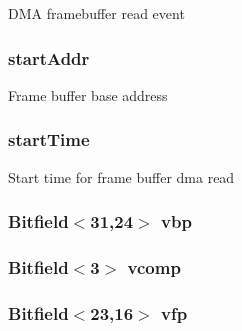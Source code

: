 \label{classPl111_a48f76313a745a16ffbdc95fbc4dfebf2}
DMA framebuffer read event \hypertarget{classPl111_aee7739bdc9884d0ee837a99b832cf0d1}{
\subsubsection[{startAddr}]{ {\bf startAddr}}}
\label{classPl111_aee7739bdc9884d0ee837a99b832cf0d1}
Frame buffer base address \hypertarget{classPl111_ab5743263961f5e71b5c28986b8b3dfbe}{
\subsubsection[{startTime}]{ {\bf startTime}}}
\label{classPl111_ab5743263961f5e71b5c28986b8b3dfbe}
Start time for frame buffer dma read \hypertarget{classPl111_ac417740b549a1c71499e509490dea6ea}{
\subsubsection[{vbp}]{\setlength{\rightskip}{0pt plus 5cm}Bitfield$<$31,24$>$ {\bf vbp}}}
\label{classPl111_ac417740b549a1c71499e509490dea6ea}
\hypertarget{classPl111_ae6e8ea09b21dba5208f69d49b81f9d2a}{
\subsubsection[{vcomp}]{\setlength{\rightskip}{0pt plus 5cm}Bitfield$<$3$>$ {\bf vcomp}}}
\label{classPl111_ae6e8ea09b21dba5208f69d49b81f9d2a}
\hypertarget{classPl111_ae4f40002505b03a4890ef738817b9cc1}{
\subsubsection[{vfp}]{\setlength{\rightskip}{0pt plus 5cm}Bitfield$<$23,16$>$ {\bf vfp}}}
